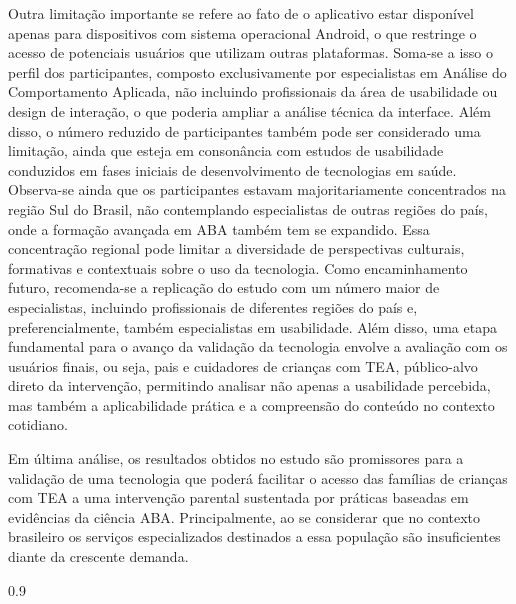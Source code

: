 \documentclass[portuguese]{textolivre}
\begin{document}
Outra limitação importante se refere ao fato de o aplicativo estar disponível apenas para dispositivos com sistema operacional Android, o que restringe o acesso de potenciais usuários que utilizam outras plataformas. Soma-se a isso o perfil dos participantes, composto exclusivamente por especialistas em Análise do Comportamento Aplicada, não incluindo profissionais da área de usabilidade ou design de interação, o que poderia ampliar a análise técnica da interface. Além disso, o número reduzido de participantes também pode ser considerado uma limitação, ainda que esteja em consonância com estudos de usabilidade conduzidos em fases iniciais de desenvolvimento de tecnologias em saúde. Observa-se ainda que os participantes estavam majoritariamente concentrados na região Sul do Brasil, não contemplando especialistas de outras regiões do país, onde a formação avançada em ABA também tem se expandido. Essa concentração regional pode limitar a diversidade de perspectivas culturais, formativas e contextuais sobre o uso da tecnologia. Como encaminhamento futuro, recomenda-se a replicação do estudo com um número maior de especialistas, incluindo profissionais de diferentes regiões do país e, preferencialmente, também especialistas em usabilidade. Além disso, uma etapa fundamental para o avanço da validação da tecnologia envolve a avaliação com os usuários finais, ou seja, pais e cuidadores de crianças com TEA, público-alvo direto da intervenção, permitindo analisar não apenas a usabilidade percebida, mas também a aplicabilidade prática e a compreensão do conteúdo no contexto cotidiano.

Em última análise, os resultados obtidos no estudo são promissores para a validação de uma tecnologia que poderá facilitar o acesso das famílias de crianças com TEA a uma intervenção parental sustentada por práticas baseadas em evidências da ciência ABA. Principalmente, ao se considerar que no contexto brasileiro os serviços especializados destinados a essa população são insuficientes diante da crescente demanda.

\begin{spacing}{0.9}
\printbibliography\label{sec-bib}
\end{spacing}
\end{document}
